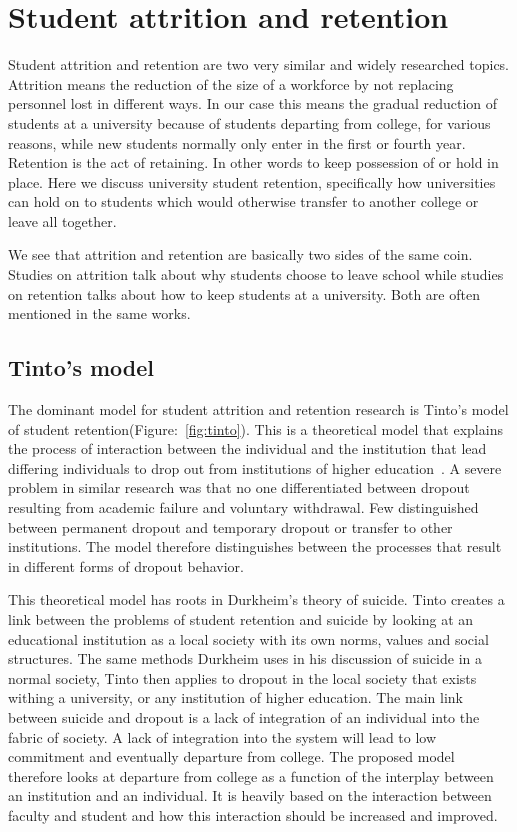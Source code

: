 \chapter{Student attrition and retention}
Student attrition and retention are two very similar and widely researched topics. 
Attrition means the reduction of the size of a workforce by not replacing personnel lost in different ways. 
In our case this means the gradual reduction of students at a university because of students departing from college, 
for various reasons, while new students normally only enter in the first or fourth year. 
Retention is the act of retaining. 
In other words to keep possession of or hold in place. 
Here we discuss university student retention, 
specifically how universities can hold on to students which would otherwise transfer to another college or leave all together.

\bigskip\noindent
We see that attrition and retention are basically two sides of the same coin. 
Studies on attrition talk about why students choose to leave school while studies on retention talks about how to keep students at a university. 
Both are often mentioned in the same works. 

\section{Tinto's model}
The dominant model for student attrition and retention research is Tinto's model of student retention(Figure:~\ref{fig:tinto}). 
This is a theoretical model that explains the process of interaction between the individual and the institution that lead differing individuals to drop out from institutions of higher education~\cite{Tinto01031975}. 
A severe problem in similar research was that no one differentiated between dropout resulting from academic failure and voluntary withdrawal. 
Few distinguished between permanent dropout and temporary dropout or transfer to other institutions. 
The model therefore distinguishes between the processes that result in different forms of dropout behavior.  


\bigskip\noindent
This theoretical model has roots in Durkheim's theory of suicide.
Tinto creates a link between the problems of student retention and suicide by looking at an educational institution as a local society with its own norms, values and social structures.
The same methods Durkheim uses in his discussion of suicide in a normal society, 
Tinto then applies to dropout in the local society that exists withing a university, 
or any institution of higher education.
The main link between suicide and dropout is a lack of integration of an individual into the fabric of society.
A lack of integration into the system will lead to low commitment and eventually departure from college.
The proposed model therefore looks at departure from college as a function of the interplay between an institution and an individual.
It is heavily based on the interaction between faculty and student and how this interaction should be increased and improved.

